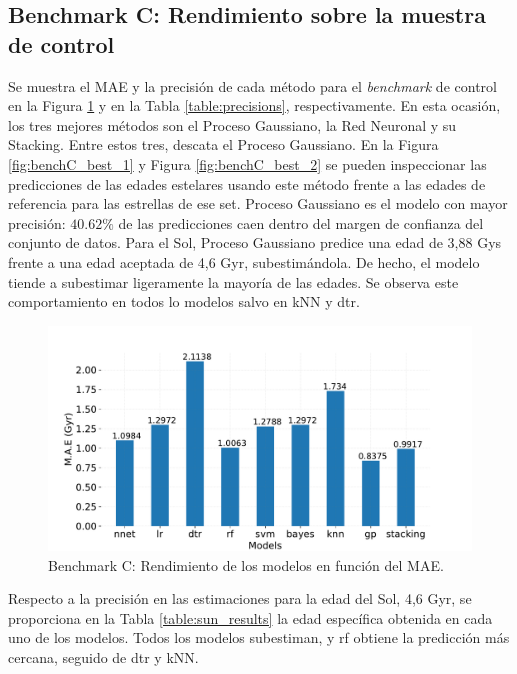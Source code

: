 \subsection{Benchmark C: Rendimiento sobre la muestra de control}

Se muestra el MAE y la precisión de cada método para el \emph{benchmark} de control en la Figura \ref{fig:benchC} y en la Tabla \ref{table:precisions}, respectivamente. En esta ocasión, los tres mejores métodos son el Proceso Gaussiano, la Red Neuronal y su Stacking. Entre estos tres, descata el Proceso Gaussiano. En la Figura \ref{fig:benchC_best_1} y Figura \ref{fig:benchC_best_2} se pueden inspeccionar las predicciones de las edades estelares usando este método frente a las edades de referencia para las estrellas de ese set. Proceso Gaussiano es el modelo con mayor precisión: $40.62\%$ de las predicciones caen dentro del margen de confianza del conjunto de datos. Para el Sol, Proceso Gaussiano predice una edad de 3,88 Gys frente a una edad aceptada de 4,6 Gyr, subestimándola. De hecho, el modelo tiende a subestimar ligeramente la mayoría de las edades. Se observa este comportamiento en todos lo modelos salvo en kNN y dtr. 

\begin{figure}[H]
\begin{center}
 \includegraphics[width=0.8\linewidth]{Figuras/Experimentos/B_C_models.pdf}
\end{center}
\caption{Benchmark C: Rendimiento de los modelos en función del MAE.}
 \label{fig:benchC}
\end{figure}

Respecto a la precisión en las estimaciones para la edad del Sol, 4,6 Gyr, se proporciona en la Tabla \ref{table:sun_results} la edad específica obtenida en cada uno de los modelos. Todos los modelos subestiman, y rf obtiene la predicción más cercana, seguido de dtr y kNN.


